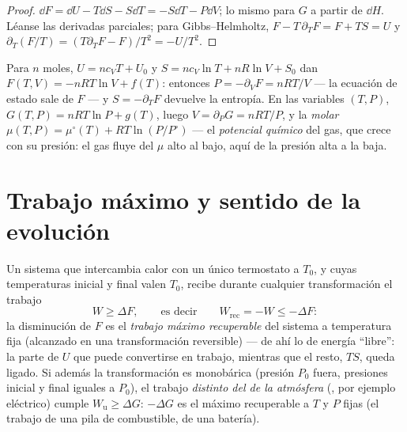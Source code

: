\begin{proof}
$\dd F = \dd U - T\dd S - S\dd T = -S\dd T - P\dd V$; lo mismo para $G$
a partir de $\dd H$. Léanse las derivadas parciales; para Gibbs--Helmholtz,
$F - T\,\partial_TF = F + TS = U$ y $\partial_T(F/T) = (T\partial_TF -
F)/T^2 = -U/T^2$.
\end{proof}

\begin{example}\label{ex:b2:thermodynamic-potentials:perfect}
Para $n$ moles, $U = nc_{V}T + U_0$ y $S = nc_V\ln T + nR\ln V + S_0$
dan $F(T,V) = -nRT\ln V + f(T)$: entonces $P = -\partial_VF = nRT/V$
--- la ecuación de estado sale de $F$ --- y $S = -\partial_TF$
devuelve la entropía. En las variables $(T,P)$, $G(T,P) = nRT\ln P +
g(T)$, luego $V = \partial_PG = nRT/P$, y la  \emph{molar}
$\mu(T,P) = \mu^\circ(T) + RT\ln(P/P^\circ)$ --- el \emph{potencial
químico} del gas, que crece con su
presión: el gas fluye del $\mu$ alto al bajo, aquí de la presión alta a la
baja.
\end{example}

\section{Trabajo máximo y sentido de la evolución}

\begin{theorem}\label{thm:b2:thermodynamic-potentials:monothermal}
Un sistema que intercambia calor con un único termostato a $T_0$, y cuyas
temperaturas inicial y final valen $T_0$, recibe durante cualquier
transformación el trabajo
\[
W \ge \Delta F , \qquad\text{es decir}\qquad W_{\text{rec}} = -W \le -\Delta F :
\]
la disminución de $F$ es el \emph{trabajo máximo recuperable} del
sistema a temperatura fija (alcanzado en una transformación reversible) ---
de ahí lo de energía ``libre'': la parte de $U$ que puede convertirse en trabajo, mientras que
el resto, $TS$, queda ligado. Si además la transformación es monobárica
(presión $P_0$ fuera, presiones inicial y final iguales a $P_0$), el trabajo
\emph{distinto del de la atmósfera} (, por ejemplo eléctrico)
cumple $W_{\text{u}} \ge \Delta G$: $-\Delta G$ es el  máximo
recuperable a $T$ y $P$ fijas (el trabajo de una pila de combustible, de una
batería).
\end{theorem}

